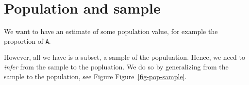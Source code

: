 \documentclass[
  letterpaper,
  DIV=11,
  numbers=noendperiod]{scrreprt}
\theoremstyle{definition}
\theoremstyle{definition}
\theoremstyle{remark}
\begin{document}
\hypertarget{population-and-sample}{%
\section{Population and sample}\label{population-and-sample}}

We want to have an estimate of some population value, for example the
proportion of \texttt{A}.

However, all we have is a subset, a sample of the populuation. Hence, we
need to \emph{infer} from the sample to the popluation. We do so by
generalizing from the sample to the population, see Figure
Figure~\ref{fig-pop-sample}.

\begin{figure}

\begin{minipage}[t]{0.50\linewidth}

{\centering 


}

\end{minipage}%
%
\begin{minipage}[t]{0.50\linewidth}


\end{minipage}
\end{figure}
\end{document}
